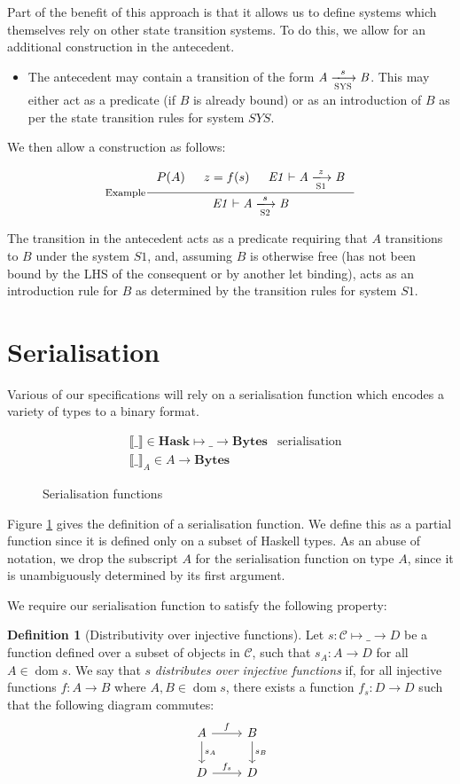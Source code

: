 \documentclass[11pt,a4paper]{article}
\DeclareMathOperator{\dom}{dom}
\newcommand{\var}[1]{\mathit{#1}}
\newcommand{\bytes}{\textbf{Bytes}}
\theoremstyle{definition}
\newtheorem{definition}{Definition}[section]
\theoremstyle{remark}
\begin{document}
Part of the benefit of this approach is that it allows us to define systems
which themselves rely on other state transition systems. To do this, we allow
for an additional construction in the antecedent.

\begin{itemize}
\item The antecedent may contain a transition of the form $\tion{SYS}{A}{s}{B}$.
    This may either act as a predicate (if $B$ is already bound) or as an
    introduction of $B$ as per the state transition rules for system $\var{SYS}$.
\end{itemize}

We then allow a construction as follows:

\[
  \inference[Example]
    {P(A) & z = f(s) & \tion[E1]{S1}{A}{z}{B}}
    {\tion[E1]{S2}{A}{s}{B}}
\]

The transition in the antecedent acts as a predicate requiring that $A$
transitions to $B$ under the system $S1$, and, assuming $B$ is otherwise free
(has not been bound by the LHS of the consequent or by another let binding),
acts as an introduction rule for $B$ as determined by the transition rules for
system $S1$.

\section{Serialisation}
Various of our specifications will rely on a serialisation function which
encodes a variety of types to a binary format.

\begin{figure}[h]
  \label{fig:serialisation}
  \begin{align*}
    & \llbracket\_\rrbracket \in \textbf{Hask}\mapsto\_\to\bytes
    & \text{serialisation} \\
    & \llbracket\_\rrbracket_{A} \in \var{A}\to\bytes
  \end{align*}
  \caption{Serialisation functions}
\end{figure}

Figure \ref{fig:serialisation} gives the definition of a serialisation function.
We define this as a partial function since it is defined only on a subset of
Haskell types. As an abuse of notation, we drop the subscript $A$ for the
serialisation function on type $A$, since it is unambiguously determined by its
first argument.

We require our serialisation function to satisfy the following property:
\begin{definition}[Distributivity over injective functions]
  Let $s:\mathcal{C}\mapsto\_\to\var{D}$ be a function defined over a subset of
  objects in $\mathcal{C}$, such that $s_A:A\to\var{D}$ for all $A\in\dom{s}$.
  We say that $s$ \textit{distributes over injective functions} if, for all
  injective functions $f:A\to B$ where $A,B\in\dom{s}$, there exists a function
  $f_s:\var{D}\to\var{D}$ such that the following diagram commutes:
  \[
    \begin{tikzcd}
      A \arrow{r}{f} \arrow{d}{s_A} & B \arrow{d}{s_B} \\
      D \arrow{r}{f_s} & D
    \end{tikzcd}
  \]
\end{definition}
\end{document}
